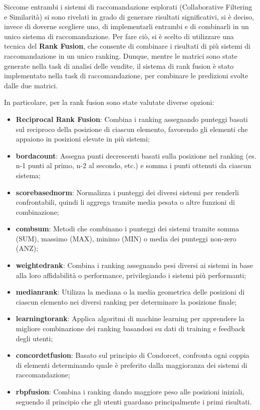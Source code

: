 Siccome entrambi i sistemi di raccomandazione esplorati (Collaborative Filtering e Similarità) si sono rivelati in grado di generare risultati significativi, si è deciso, invece di doverne scegliere uno, di implementarli entrambi e di combinarli in un unico sistema di raccomandazione. Per fare ciò, si è scelto di utilizzare una tecnica del \textbf{Rank Fusion}, che consente di combinare i risultati di più sistemi di raccomandazione in un unico ranking.
Dunque, mentre le matrici sono state generate nella task di analisi delle vendite, il sistema di rank fusion è stato implementato nella task di raccomandazione, per combinare le predizioni svolte dalle due matrici.

In particolare, per la rank fusion sono state valutate diverse opzioni:
\begin{itemize}
    \item \textbf{Reciprocal Rank Fusion}: Combina i ranking assegnando punteggi basati sul reciproco della posizione di ciascun elemento, favorendo gli elementi che appaiono in posizioni elevate in più sistemi;
    \item \textbf{\gls{bordacount}}: Assegna punti decrescenti basati sulla posizione nel ranking (es. n-1 punti al primo, n-2 al secondo, etc.) e somma i punti ottenuti da ciascun sistema;
    \item \textbf{\gls{scorebasednorm}}: Normalizza i punteggi dei diversi sistemi per renderli confrontabili, quindi li aggrega tramite media pesata o altre funzioni di combinazione;
    \item \textbf{\gls{combsum}}: Metodi che combinano i punteggi dei sistemi tramite somma (SUM), massimo (MAX), minimo (MIN) o media dei punteggi non-zero (ANZ);
    \item \textbf{\gls{weightedrank}}: Combina i ranking assegnando pesi diversi ai sistemi in base alla loro affidabilità o performance, privilegiando i sistemi più performanti;
    \item \textbf{\gls{medianrank}}: Utilizza la mediana o la media geometrica delle posizioni di ciascun elemento nei diversi ranking per determinare la posizione finale;
    \item \textbf{\gls{learningtorank}}: Applica algoritmi di machine learning per apprendere la migliore combinazione dei ranking basandosi su dati di training e feedback degli utenti;
    \item \textbf{\gls{concordetfusion}}: Basato sul principio di Condorcet, confronta ogni coppia di elementi determinando quale è preferito dalla maggioranza dei sistemi di raccomandazione;
    \item \textbf{\gls{rbpfusion}}: Combina i ranking dando maggiore peso alle posizioni iniziali, seguendo il principio che gli utenti guardano principalmente i primi risultati.
\end{itemize}

